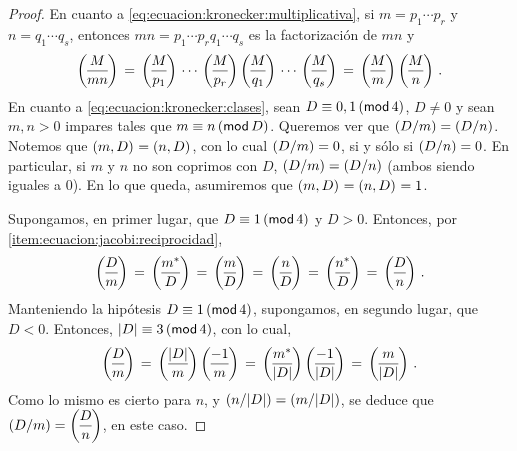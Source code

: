 \begin{proof}
	En cuanto a \eqref{eq:ecuacion:kronecker:multiplicativa}, si
	$m=p_1\cdots p_r$ y $n=q_1\cdots q_s$, entonces
	$mn=p_1\cdots p_rq_1\cdots q_s$ es la factorizaci\'on de $mn$ y
	\begin{displaymath}
		\jacobi M{mn}\,=\,
			\legendre M{p_1}\,\cdots\,\legendre M{p_r}\,
			\legendre M{q_1}\,\cdots\,\legendre M{q_s}\,=\,
			\jacobi M{m}\,\jacobi M{n}
		\text{ .}
	\end{displaymath}
	En cuanto a \eqref{eq:ecuacion:kronecker:clases}, sean
	$D\equiv 0,1\tmodulo[4]$, $D\neq 0$ y sean $m,n>0$ impares tales
	que $m\equiv n\tmodulo[D]$. Queremos ver que
	$\tjacobi D{m}=\tjacobi D{n}$. Notemos que $\mcd{m,D}=\mcd{n,D}$,
	con lo cual $\tjacobi D{m}=0$, si y s\'olo si $\tjacobi D{n}=0$.
	En particular, si $m$ y $n$ no son coprimos con $D$,
	$\tjacobi D{m}=\tjacobi D{n}$ (ambos siendo iguales a $0$).
	En lo que queda, asumiremos que $\mcd{m,D}=\mcd{n,D}=1$.

	Supongamos, en primer lugar, que $D\equiv 1\tmodulo[4]$ y $D>0$.
	Entonces, por \eqref{item:ecuacion:jacobi:reciprocidad},
	\begin{displaymath}
		\jacobi D{m}\,=\,\jacobi{m^*} D\,=\,\jacobi{m} D\,=\,
		\jacobi{n} D\,=\,\jacobi{n^*} D\,=\,\jacobi D{n}
		\text{ .}
	\end{displaymath}
	Manteniendo la hip\'otesis $D\equiv 1\tmodulo[4]$, supongamos, en
	segundo lugar, que $D<0$. Entonces, $|D|\equiv 3\tmodulo[4]$,
	con lo cual,
	\begin{displaymath}
		\jacobi D{m}\,=\,\jacobi{|D|} m\,\jacobi{-1} m\,=\,
		\jacobi{m^*}{|D|}\,\jacobi{-1}{|D|}\,=\,
		\jacobi m{|D|}
		\text{ .}
	\end{displaymath}
	Como lo mismo es cierto para $n$, y $\tjacobi n{|D|}=\tjacobi m{|D|}$,
	se deduce que $\tjacobi D{m}=\jacobi D{n}$, en este caso.


\end{proof}
